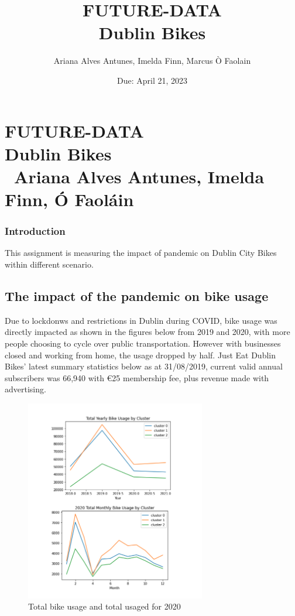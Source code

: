 \documentclass[11pt, singlecolumn, citestyle=authoryear]{elegantbook}
\title{FUTURE-DATA\\Dublin Bikes}
\date{Due: April 21, 2023}
\author{Ariana Alves Antunes, Imelda Finn, Marcus Ò Faolain}
\begin{document}
	\mainmatter 
	
\chapter*{FUTURE-DATA\\Dublin Bikes \\\ Ariana Alves Antunes, Imelda Finn, Ó Faoláin}

 	\subsection*{Introduction}
This assignment is measuring the impact of pandemic on Dublin City Bikes within different scenario. 
	

\section {The impact of the pandemic on bike usage}
	Due to lockdonws and restrictions in Dublin during COVID,  bike usage was directly impacted as shown in the figures below from 2019 and 2020, with more people  choosing to cycle over public transportation. However with businesses closed and working from home, the usage dropped by half. Just Eat Dublin Bikes’ latest summary statistics below as at 31/08/2019, current valid annual subscribers  was 66,940 with €25 membership fee, plus revenue made with advertising. 

	\begin{figure}[h!]
		\includegraphics[width=0.7\textwidth]{../graphs/usaged_total_plus2020.png}
		\caption{Total bike usage and total usaged for 2020}
		\label{fig:surface}
	\end{figure}
\end{document}
